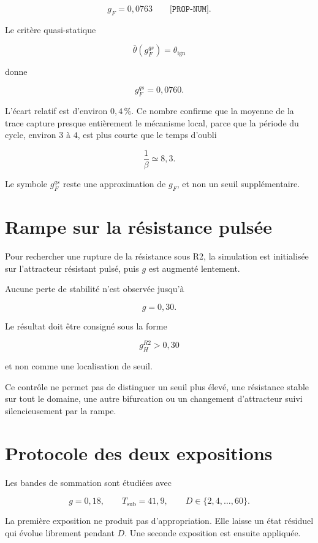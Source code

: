 \[
\boxed{g_F=0{,}0763}
\qquad
\texttt{[PROP-NUM]}.
\]

Le critère quasi-statique

\[
\bar\theta(g_F^{qs})=\theta_{\mathrm{ign}}
\]

donne

\[
\boxed{g_F^{qs}=0{,}0760.}
\]

L'écart relatif est d'environ \(0{,}4\,\%\). Ce nombre confirme que la
moyenne de la trace capture presque entièrement le mécanisme local,
parce que la période du cycle, environ \(3\) à \(4\), est plus courte
que le temps d'oubli

\[
\frac{1}{\beta}\simeq8{,}3.
\]

Le symbole \(g_F^{qs}\) reste une approximation de \(g_F\), et non un
seuil supplémentaire.

\section{Rampe sur la résistance pulsée}
\label{annexe-num-rampe-resistance-pulsee}

Pour rechercher une rupture de la résistance sous R2, la simulation
est initialisée sur l'attracteur résistant pulsé, puis \(g\) est
augmenté lentement.

Aucune perte de stabilité n'est observée jusqu'à

\[
g=0{,}30.
\]

Le résultat doit être consigné sous la forme

\[
\boxed{g_H^{R2}>0{,}30}
\]

et non comme une localisation de seuil.

Ce contrôle ne permet pas de distinguer un seuil plus élevé, une
résistance stable sur tout le domaine, une autre bifurcation ou un
changement d'attracteur suivi silencieusement par la rampe.

\section{Protocole des deux expositions}
\label{annexe-num-deux-expositions}

Les bandes de sommation sont étudiées avec

\[
g=0{,}18,
\qquad
T_{\mathrm{sub}}=41{,}9,
\qquad
D\in\{2,4,\ldots,60\}.
\]

La première exposition ne produit pas d'appropriation. Elle laisse un
état résiduel qui évolue librement pendant \(D\). Une seconde
exposition est ensuite appliquée.

